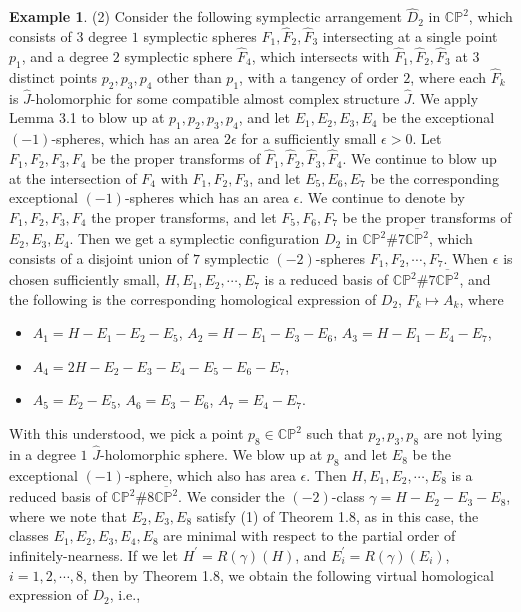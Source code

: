 \documentclass[11pt]{amsart}
\theoremstyle{plain}
\numberwithin{theorem}{section}
\theoremstyle{definition}
\newtheorem{example}[theorem]{Example}
\newcommand{\C}{{\mathbb C}}
\renewcommand{\P}{{\mathbb P}}
\begin{document}
\begin{example}
(2) Consider the following symplectic arrangement $\hat{D}_2$ in $\C\P^2$, which consists of $3$ degree $1$
symplectic spheres $\hat{F}_1, \hat{F}_2,\hat{F}_3$ intersecting at a single point $p_1$, and a degree $2$
symplectic sphere $\hat{F}_4$, which intersects with $\hat{F}_1, \hat{F}_2,\hat{F}_3$ at $3$ distinct points $p_2,p_3,p_4$ other than $p_1$, with a tangency of order $2$, where each $\hat{F}_k$ is $\hat{J}$-holomorphic for some compatible almost complex structure $\hat{J}$. We apply Lemma 3.1 to blow up at $p_1,p_2,p_3,p_4$, and let $E_1,E_2,E_3,E_4$ be the exceptional $(-1)$-spheres, which has an area $2\epsilon$ for a sufficiently small 
$\epsilon>0$. Let $F_1,F_2, F_3,F_4$ be the proper transforms of $\hat{F}_1, \hat{F}_2,\hat{F}_3,\hat{F}_4$. 
We continue to blow up at the intersection of $F_4$ with $F_1,F_2, F_3$, and let $E_5,E_6,E_7$ be the corresponding exceptional $(-1)$-spheres which has an area $\epsilon$. We continue to denote by 
$F_1,F_2, F_3,F_4$ the proper transforms, and let $F_5,F_6,F_7$ be the proper transforms of $E_2,E_3,E_4$. 
Then we get a symplectic configuration $D_2$ in $\C\P^2\#7\overline{\C\P^2}$, which consists of a disjoint union
of $7$ symplectic $(-2)$-spheres $F_1,F_2,\cdots,F_7$. When $\epsilon$ is chosen sufficiently small, $H, E_1,E_2,\cdots,E_7$ is a reduced basis of $\C\P^2\#7\overline{\C\P^2}$, and the following is the corresponding homological expression of $D_2$, $F_k\mapsto A_k$, where
\begin{itemize}
\item $A_1=H-E_{1}-E_{2}-E_{5}$, $A_2=H-E_{1}-E_{3}-E_{6}$, $A_3=H-E_{1}-E_{4}-E_{7}$, 
\item $A_4=2H-E_{2}-E_3-E_{4}-E_5-E_{6}-E_7$, 
\item $A_5=E_{2}-E_{5}$, $A_6=E_{3}-E_{6}$, $A_7=E_{4}-E_{7}$.
\end{itemize}
With this understood, we pick a point $p_8\in \C\P^2$ such that $p_2,p_3,p_8$ are not lying in a degree $1$
$\hat{J}$-holomorphic sphere. We blow up at $p_8$ and let $E_8$ be the exceptional $(-1)$-sphere, which also
has area $\epsilon$. Then $H, E_1,E_2,\cdots,E_8$ is a reduced basis of $\C\P^2\#8\overline{\C\P^2}$.
We consider the $(-2)$-class $\gamma=H-E_2-E_3-E_8$, where we note that $E_2,E_3,E_8$ satisfy (1) of 
Theorem 1.8, as in this case, the classes $E_1,E_2, E_3,E_4,E_8$ are minimal with respect to the partial order 
of infinitely-nearness. If we let $H^\prime=R(\gamma)(H)$, and $E_i^\prime=R(\gamma)(E_i)$, $i=1,2,\cdots,8$, 
then by Theorem 1.8, we obtain the following virtual homological expression of $D_2$, i.e., 

\end{example}
\end{document}
